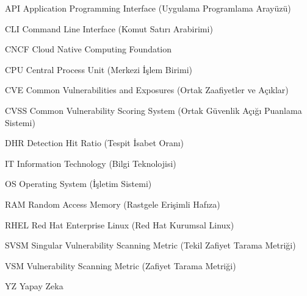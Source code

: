 \vspace{+2pt}
\begin{simge}
	\item [API]     Application Programming Interface (Uygulama Programlama Arayüzü)
	\item [CLI]     Command Line Interface (Komut Satırı Arabirimi)
	\item [CNCF]    Cloud Native Computing Foundation
	\item [CPU]     Central Process Unit (Merkezi İşlem Birimi)
	\item [CVE]     Common Vulnerabilities and Exposures (Ortak Zaafiyetler ve Açıklar)
	\item [CVSS]    Common Vulnerability Scoring System (Ortak Güvenlik Açığı Puanlama Sistemi)
	\item [DHR]     Detection Hit Ratio (Tespit İsabet Oranı)
	\item [IT]      Information Technology (Bilgi Teknolojisi)
	\item [OS]      Operating System (İşletim Sistemi)
	\item [RAM]     Random Access Memory (Rastgele Erişimli Hafıza)
	\item [RHEL]    Red Hat Enterprise Linux (Red Hat Kurumsal Linux)
	\item [SVSM]    Singular Vulnerability Scanning Metric (Tekil Zafiyet Tarama Metriği)
	\item [VSM]     Vulnerability Scanning Metric (Zafiyet Tarama Metriği)
	\item [YZ]      Yapay Zeka
\end{simge}
